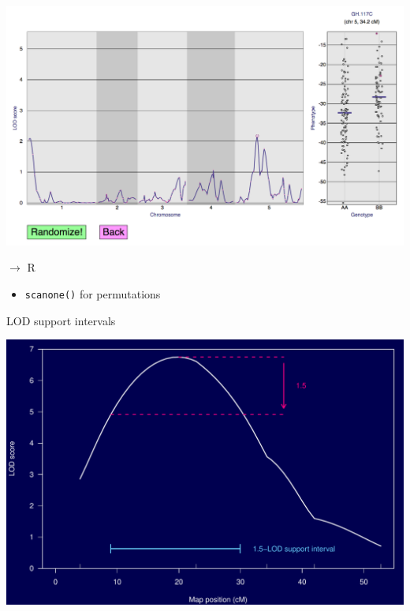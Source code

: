\documentclass[12pt]{article}
\newcommand{\headsize}{\fontsize{35}{35} \selectfont}
\newcommand{\smallsize}{\fontsize{25}{30} \selectfont}
\begin{document}
\centerline{\href{http://www.biostat.wisc.edu/~kbroman/D3/lod_random}{\includegraphics[width=10in]{FigsA/interactive_perm_test.png}}}

\vspace*{1cm}




\newpage

\headsize \color{myyellow}
$\boldsymbol{\rightarrow}$ R

\vspace{3cm}

\color{mywhite} \smallsize

\hfill \begin{minipage}[t]{9.5in}
\begin{itemize}
\itemsep24pt
\item \verb|scanone()| for permutations
\end{itemize} \end{minipage}








\newpage

\headsize \color{myyellow}
\hfill \begin{minipage}{5.75in}
\centering
LOD support intervals
\end{minipage}

\vfill

\centerline{\includegraphics{FigsA/lodsuppint.pdf}}
\end{document}
